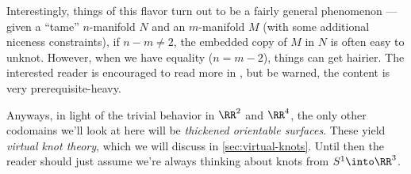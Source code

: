 Interestingly, things of this flavor turn out to be a fairly general
phenomenon --- given a ``tame'' $n$-manifold $N$ and an $m$-manifold
$M$ (with some additional niceness constraints), if $n - m \neq 2$,
the embedded copy of $M$ in $N$ is often easy to unknot. However, when
we have equality ($n = m-2$), things can get hairier. The interested
reader is encouraged to read more in \cite{Daverman}, but be warned,
the content is very prerequisite-heavy.

Anyways, in light of the trivial behavior in $\RR^2$ and $\RR^4$, the
only other codomains we'll look at here will be \emph{thickened
  orientable surfaces}. These yield \emph{virtual knot theory}, which
we will discuss in \cref{sec:virtual-knots}. Until then the reader
should just assume we're always thinking about knots from $S^1 \into
\RR^3$.



